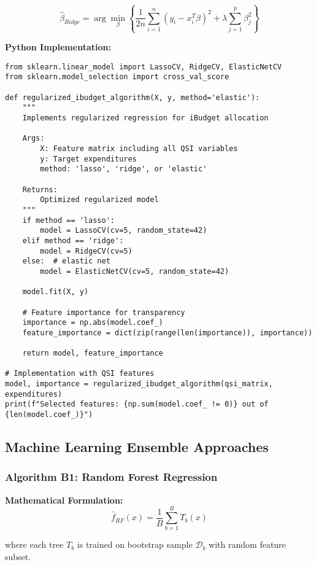 \begin{equation}
\hat{\beta}_{Ridge} = \arg\min_{\beta} \left\{\frac{1}{2n}\sum_{i=1}^{n}(y_i - x_i^T\beta)^2 + \lambda\sum_{j=1}^{p}\beta_j^2\right\}
\end{equation}

\textbf{Python Implementation:}
\begin{lstlisting}
from sklearn.linear_model import LassoCV, RidgeCV, ElasticNetCV
from sklearn.model_selection import cross_val_score

def regularized_ibudget_algorithm(X, y, method='elastic'):
    """
    Implements regularized regression for iBudget allocation
    
    Args:
        X: Feature matrix including all QSI variables
        y: Target expenditures
        method: 'lasso', 'ridge', or 'elastic'
    
    Returns:
        Optimized regularized model
    """
    if method == 'lasso':
        model = LassoCV(cv=5, random_state=42)
    elif method == 'ridge':
        model = RidgeCV(cv=5)
    else:  # elastic net
        model = ElasticNetCV(cv=5, random_state=42)
    
    model.fit(X, y)
    
    # Feature importance for transparency
    importance = np.abs(model.coef_)
    feature_importance = dict(zip(range(len(importance)), importance))
    
    return model, feature_importance

# Implementation with QSI features
model, importance = regularized_ibudget_algorithm(qsi_matrix, expenditures)
print(f"Selected features: {np.sum(model.coef_ != 0)} out of {len(model.coef_)}")
\end{lstlisting}

\subsection{Machine Learning Ensemble Approaches}

\subsubsection{Algorithm B1: Random Forest Regression}

\textbf{Mathematical Formulation:}
\begin{equation}
\hat{f}_{RF}(x) = \frac{1}{B}\sum_{b=1}^{B} T_b(x)
\end{equation}

where each tree $T_b$ is trained on bootstrap sample $\mathcal{D}_b$ with random feature subset.

